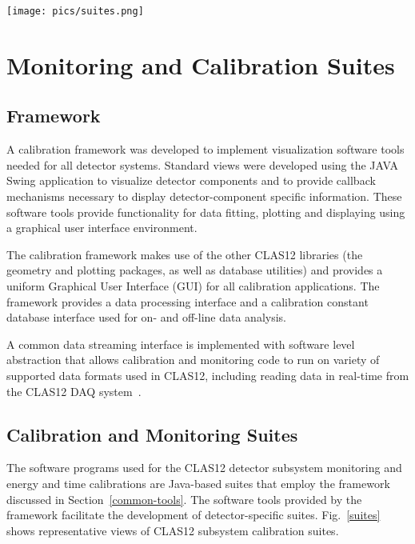 \begin{figure*}
\centering
\texttt{[image: pics/suites.png]}
\caption{Representative subsystem calibration GUIs for ECAL~\cite{ecal-nim} (upper left),
DC~\cite{dc-nim} (upper right), FTOF~\cite{ftof-nim} (lower left),  and FT~\cite{ft-nim} (lower right).}
\label{suites}
\end{figure*}
\section{Monitoring and Calibration Suites}\label{sec:calibration}

\subsection{Framework}

A calibration framework was developed to implement visualization software tools needed for all detector
systems. Standard views were developed using the JAVA Swing application to visualize detector components and to provide callback
mechanisms necessary to display detector-component specific information.  These software tools provide
functionality for data fitting, plotting and displaying using a graphical user interface environment.

The calibration framework makes use of the other CLAS12 libraries
(the geometry and plotting packages, as well as database utilities) and provides a uniform Graphical User
Interface (GUI) for all calibration applications. The framework provides a data processing interface
and a calibration constant database interface used
for on- and off-line data analysis.

A common data streaming interface is implemented with software level abstraction that allows calibration and monitoring
code to run on variety of supported data formats used in CLAS12, including reading data in real-time from the CLAS12 DAQ system~\cite{daq-nim}.


\subsection{Calibration and Monitoring Suites}

The software programs used for the CLAS12 detector subsystem monitoring and energy and time calibrations are
Java-based suites that employ the framework discussed in Section~\ref{common-tools}.
The software tools provided by the framework facilitate the development of
detector-specific suites. Fig.~\ref{suites} shows representative views of CLAS12 subsystem calibration suites.

